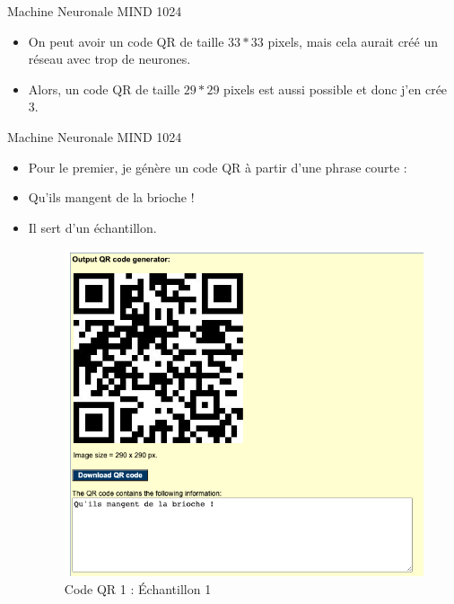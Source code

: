 \documentclass{beamer}
\begin{document}
\begin{frame}{Machine Neuronale MIND 1024}
    \begin{itemize}[<+-| alert@+>] %
        \item On peut avoir un code QR de taille $33*33$ pixels, mais cela aurait créé un réseau avec trop de neurones.
        \item Alors, un code QR de taille $29*29$ pixels est aussi possible et donc j'en crée 3.
    \end{itemize}
\end{frame}

\begin{frame}{Machine Neuronale MIND 1024}
    \begin{itemize}[<+-| alert@+>] %
        \item Pour le premier, je génère un code QR à partir d'une phrase courte :
        \item \og Qu'ils mangent de la brioche !\fg{}
        \item Il sert d'un échantillon.
        \begin{figure}
            \centering
            \includegraphics[width=0.5\linewidth]{pic/qr1.png}
            \caption{Code QR 1 : Échantillon 1}
        \end{figure}
    \end{itemize}
\end{frame}
\end{document}
